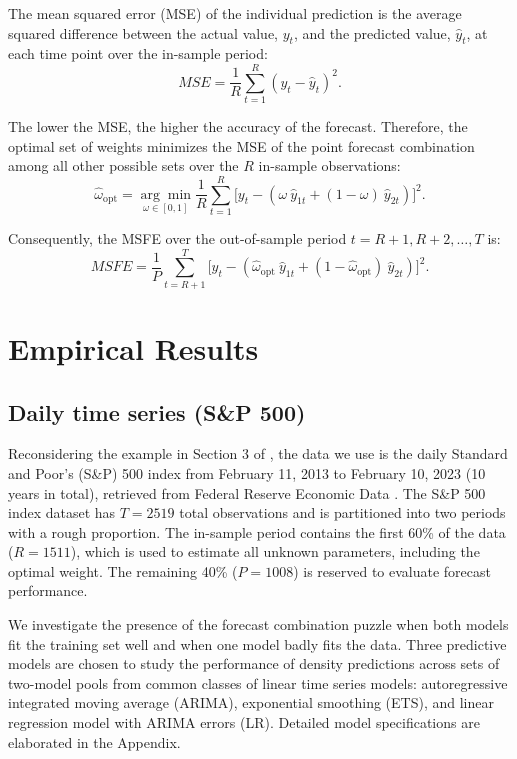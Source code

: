 \documentclass{monashthesis}
\begin{document}
The mean squared error (MSE) of the individual prediction is the average squared difference between the actual value, \(y_t\), and the predicted value, \(\hat y_t\), at each time point over the in-sample period:
\begin{equation*}
MSE = \frac{1}{R} \sum^R_{t=1} (y_t - \hat y_t)^2.
\end{equation*}

The lower the MSE, the higher the accuracy of the forecast. Therefore, the optimal set of weights minimizes the MSE of the point forecast combination among all other possible sets over the \(R\) in-sample observations:
\begin{equation*}
\hat{\omega}_{\text{opt}} = \underset{\omega \in [0,1]}{\arg\min} \frac{1}{R} \sum^R_{t=1} \Big[y_t - (\omega \ \hat y_{1t} + (1-\omega) \ \hat y_{2t})\Big]^2.
\end{equation*}

Consequently, the MSFE over the out-of-sample period \(t = R+1, R+2, \dots, T\) is:
\begin{equation*}
MSFE = \frac{1}{P} \sum^T_{t = R+1} \Big[y_t - (\hat{\omega}_{\text{opt}} \ \hat y_{1t} + (1-\hat{\omega}_{\text{opt}}) \ \hat y_{2t}) \Big]^2.
\end{equation*}

\hypertarget{empirical-results}{%
\chapter{Empirical Results}\label{empirical-results}}

\hypertarget{sp500}{%
\section{Daily time series (S\&P 500)}\label{sp500}}

Reconsidering the example in Section 3 of \textcite{GA11}, the data we use is the daily Standard and Poor's (S\&P) 500 index from February 11, 2013 to February 10, 2023 (10 years in total), retrieved from Federal Reserve Economic Data \autocite{SP500}. The S\&P 500 index dataset has \(T = 2519\) total observations and is partitioned into two periods with a rough proportion. The in-sample period contains the first 60\% of the data (\(R = 1511\)), which is used to estimate all unknown parameters, including the optimal weight. The remaining 40\% (\(P = 1008\)) is reserved to evaluate forecast performance.

We investigate the presence of the forecast combination puzzle when both models fit the training set well and when one model badly fits the data. Three predictive models are chosen to study the performance of density predictions across sets of two-model pools from common classes of linear time series models: autoregressive integrated moving average (ARIMA), exponential smoothing (ETS), and linear regression model with ARIMA errors (LR). Detailed model specifications are elaborated in the Appendix.
\end{document}
